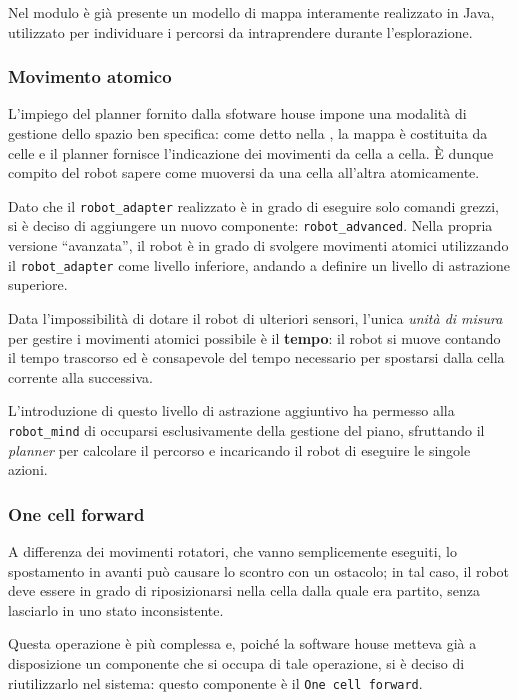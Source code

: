 Nel modulo è già presente un modello di mappa interamente realizzato in Java, utilizzato per individuare i percorsi da intraprendere durante l'esplorazione.

\subsubsection{Movimento atomico}

L'impiego del planner fornito dalla sfotware house impone una modalità di gestione dello spazio ben specifica:
come detto nella , la mappa è costituita da celle e il planner fornisce l'indicazione dei movimenti da cella a cella.
È dunque compito del robot sapere come muoversi da una cella all'altra atomicamente.

Dato che il \texttt{robot\_adapter} realizzato è in grado di eseguire solo comandi grezzi, si è deciso di aggiungere un nuovo componente: \texttt{robot\_advanced}.
Nella propria versione ``avanzata'', il robot è in grado di svolgere movimenti atomici utilizzando il \texttt{robot\_adapter} come livello inferiore, andando a definire un livello di astrazione superiore.

Data l'impossibilità di dotare il robot di ulteriori sensori, l'unica \textit{unità di misura} per gestire i movimenti atomici possibile è il \textbf{tempo}:
il robot si muove contando il tempo trascorso ed è consapevole del tempo necessario per spostarsi dalla cella corrente alla successiva.

L'introduzione di questo livello di astrazione aggiuntivo ha permesso alla \texttt{robot\_mind} di occuparsi esclusivamente della gestione del piano, sfruttando il \textit{planner} per calcolare il percorso e incaricando il robot di eseguire le singole azioni.

\subsubsection{One cell forward}

A differenza dei movimenti rotatori, che vanno semplicemente eseguiti, lo spostamento in avanti può causare lo scontro con un ostacolo;
in tal caso, il robot deve essere in grado di riposizionarsi nella cella dalla quale era partito, senza lasciarlo in uno stato inconsistente.

Questa operazione è più complessa e, poiché la software house metteva già a disposizione un componente che si occupa di tale operazione, si è deciso di riutilizzarlo nel sistema:
questo componente è il \texttt{One cell forward}.

